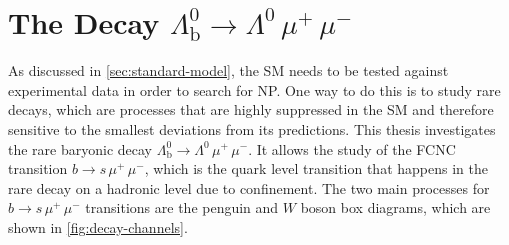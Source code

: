 \section{\texorpdfstring{The Decay $\Lambda_{\text{b}}^0 \to \Lambda^0 \, \mu^+ \, \mu^-$}{The Decay Lambda_b to Lambda mumu}}
\label{sec:decay-lambda-b}
As discussed in \cref{sec:standard-model}, the SM needs to be tested against experimental data in order to search for NP.
One way to do this is to study rare decays, which are processes that are highly suppressed in the SM and therefore sensitive to the smallest deviations 
from its predictions. This thesis investigates the rare baryonic decay $\Lambda_{\text{b}}^0 \to \Lambda^0 \, \mu^+ \, \mu^-$. It allows the study of the
FCNC transition $b \to s \, \mu^+ \, \mu^-$, which is the quark level transition that happens in the rare decay on a hadronic level due to confinement.
The two main processes for $b \to s \, \mu^+ \, \mu^-$ transitions are the penguin and $W$ boson box diagrams, which are 
shown in \cref{fig:decay-channels}.
